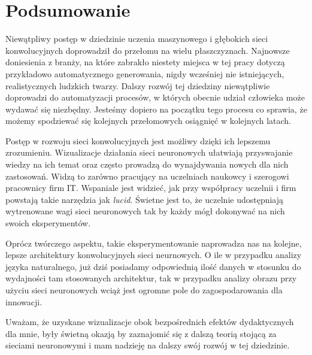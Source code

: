 \chapter{Podsumowanie}
\label{chap:summary}

Niewątpliwy postęp w dziedzinie uczenia maszynowego i głębokich sieci konwolucyjnych doprowadził do przełomu na wielu płaszczyznach. Najnowsze doniesienia z branży, na które zabrakło niestety miejsca w tej pracy dotyczą przykładowo automatycznego generowania, nigdy wcześniej nie istniejących, realistycznych ludzkich twarzy.
Dalszy rozwój tej dziedziny niewątpliwie doprowadzi do automatyzacji procesów, w których obecnie udział człowieka może wydawać się niezbędny. Jesteśmy dopiero na początku tego procesu co sprawia, że możemy spodziewać się kolejnych przełomowych osiągnięć w kolejnych latach.

Postęp w rozwoju sieci konwolucyjnych jest możliwy dzięki ich lepszemu zrozumieniu. Wizualizacje działania sieci neuronowych ułatwiają przyswajanie wiedzy na ich temat oraz często prowadzą do wynajdywania nowych dla nich zastosowań. Widzą to zarówno pracujący na uczelniach naukowcy i szerogowi pracownicy firm IT. Wspaniale jest widzieć, jak przy współpracy uczelnii i firm powstają takie narzędzia jak \textit{lucid}. Świetne jest to, że uczelnie udostępniają wytrenowane
wagi sieci neuronowych tak by każdy mógł dokonywać na nich swoich eksperymentów.

Oprócz twórczego aspektu, takie eksperymentowanie naprowadza nas na kolejne, lepsze architektury konwolucyjnych sieci neurnowych. O ile w przypadku analizy języka naturalnego, już dziś posiadamy odpowiednią ilość danych w stosunku do wydajności tam stosowanych architektur, tak w przypadku analizy obrazu przy użyciu sieci neuronowych wciąż jest ogromne pole do zagospodarowania dla innowacji.

Uważam, że uzyskane wizualizacje obok bezpośrednich efektów dydaktycznych dla mnie, były świetną okazją by zaznajomić się z dalszą teorią stojącą za sieciami neuronowymi i mam nadzieję na dalszy swój rozwój w tej dziedzinie.
